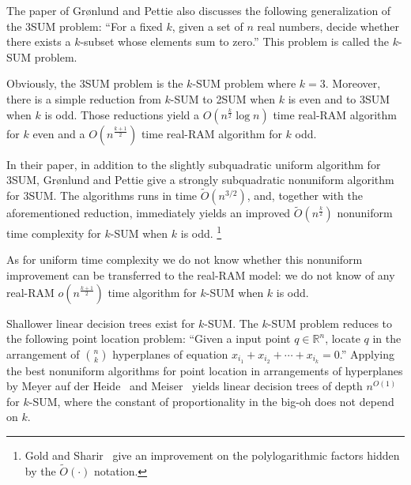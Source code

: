 The paper of Gr\o nlund and Pettie also discusses the following generalization of
the 3SUM problem: ``For a fixed \(k\), given a set of \(n\) real numbers,
decide whether there exists a \(k\)-subset whose elements sum to zero.''
This problem is called the \(k\)-SUM problem.

Obviously, the 3SUM problem is the \(k\)-SUM problem where \(k=3\).
Moreover, there is a simple reduction from \(k\)-SUM to 2SUM when \(k\) is even
and to 3SUM when \(k\) is odd. Those reductions yield a
\(O(n^{\frac{k}{2}} \log n)\) time real-RAM algorithm for \(k\) even and a
\(O(n^{\frac{k+1}{2}})\) time real-RAM algorithm for \(k\) odd.

In their paper, in addition to the slightly subquadratic uniform algorithm for
3SUM, Gr\o nlund and Pettie give a strongly subquadratic nonuniform
algorithm for 3SUM. The algorithms runs in time \(\tilde{O}(n^{3/2})\), and,
together with the aforementioned reduction, immediately yields an improved
\(\tilde{O}(n^{\frac{k}{2}})\) nonuniform time complexity for \(k\)-SUM when
\(k\) is odd.%
%
\footnote{%
Gold and Sharir~\cite{GS15} give an improvement on
the polylogarithmic factors hidden by the \( \tilde{O}(\cdot) \)
notation.%
}

As for uniform time complexity we do not know whether this nonuniform
improvement can be transferred to the real-RAM model: we do not know of any
real-RAM \(o(n^{\frac{k+1}{2}})\) time algorithm for \(k\)-SUM when
\(k\) is odd.

Shallower linear decision trees exist for \(k\)-SUM.
The \(k\)-SUM problem reduces to the following point location problem: ``Given
a input point \(q \in \mathbb{R}^n\), locate \(q\) in the arrangement of
\(n \choose k\) hyperplanes of equation \(x_{i_1} + x_{i_2} + \cdots +
x_{i_k} = 0\).'' Applying the best nonuniform algorithms for point location in
arrangements of hyperplanes by Meyer auf der Heide~\cite{M84} and
Meiser~\cite{M93} yields linear decision trees of depth \(n^{O(1)}\) for
\(k\)-SUM, where the constant of proportionality in the big-oh does not depend
on \(k\).
